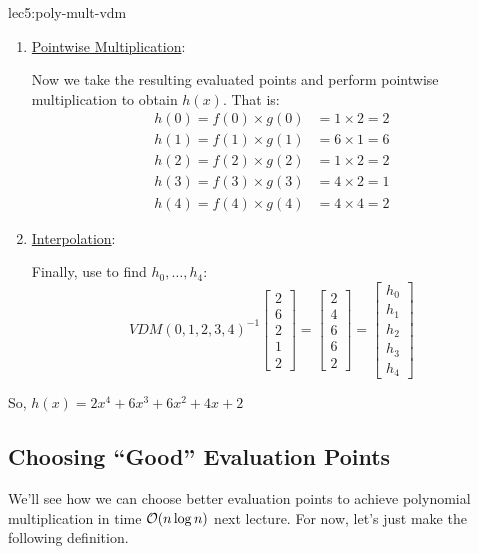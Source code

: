 \begin{example}{}{lec5:poly-mult-vdm}
\begin{enumerate}
        \item \ul{Pointwise Multiplication}:

        Now we take the resulting evaluated points and perform pointwise multiplication to obtain $h(x)$.
        That is:
        \begin{align*}
            h(0) = f(0) \times g(0) &= 1 \times 2 = 2 \\
            h(1) = f(1) \times g(1) &= 6 \times 1 = 6 \\ 
            h(2) = f(2) \times g(2) &= 1 \times 2 = 2 \\
            h(3) = f(3) \times g(3) &= 4 \times 2 = 1 \\
            h(4) = f(4) \times g(4) &= 4 \times 4 = 2
        \end{align*}

        \item \ul{Interpolation}:
        
        Finally, use  to find $h_0, \ldots, h_4$:
        \begin{equation*}
            VDM(0,1,2,3,4)^{-1}
            \begin{bmatrix}
                2 \\ 6 \\ 2 \\ 1 \\ 2
            \end{bmatrix}
            = 
            \begin{bmatrix}
                2 \\ 4 \\ 6 \\ 6 \\ 2
            \end{bmatrix}
            = 
            \begin{bmatrix}
                h_0 \\ h_1 \\ h_2 \\ h_3 \\ h_4
            \end{bmatrix}
        \end{equation*}
    \end{enumerate}

    So, $h(x) = 2x^4 + 6x^3 + 6x^2 + 4x + 2$
\end{example}

\subsection{Choosing ``Good'' Evaluation Points}
We'll see how we can choose better evaluation points to achieve polynomial multiplication in time $\operatorname{\mathcal{O}}(n\log n)$ next lecture.
For now, let's just make the following definition.

